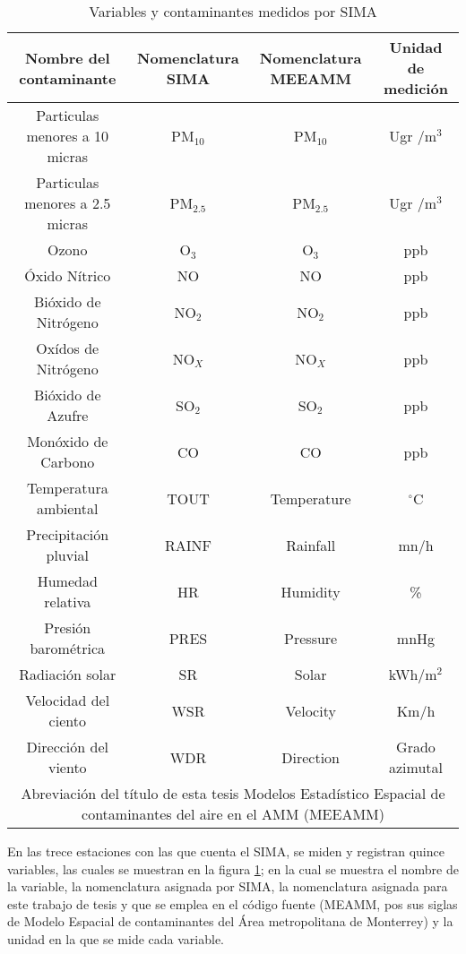 \begin{table}[H]
\centering
\caption{Variables y contaminantes medidos por SIMA}
\begin{adjustbox}{max width=0.9\textwidth}
\begin{tabular}{|c|c|c|c|}
\hline
Nombre del contaminante &Nomenclatura SIMA &Nomenclatura MEEAMM &Unidad de medición \\ \hline
Particulas menores a 10 micras &PM$_{10}$ &PM$_{10}$ &Ugr /m$^{3}$\\
Particulas menores a 2.5 micras &PM$_{2.5}$  &PM$_{2.5}$ &Ugr /m$^{3}$\\
Ozono &O$_{3}$ &O$_{3}$ &ppb\\   
Óxido Nítrico &NO &NO &ppb\\ 
Bióxido de Nitrógeno &NO$_{2}$ &NO$_{2}$ &ppb\\
Oxídos de Nitrógeno &NO$_{X}$ &NO$_{X}$ &ppb\\
Bióxido de Azufre &SO$_{2}$ &SO$_{2}$ &ppb\\
Monóxido de Carbono &CO  &CO &ppb\\
Temperatura ambiental &TOUT &Temperature &$^{\circ}$C\\
Precipitación pluvial &RAINF &Rainfall &mn/h\\
Humedad relativa &HR &Humidity &\% \\
Presión barométrica &PRES &Pressure &mnHg \\
Radiación solar &SR & Solar &kWh/m$^{2}$ \\
Velocidad del ciento &WSR &Velocity &Km/h \\
Dirección del viento &WDR &Direction &Grado azimutal\\ \hline
\multicolumn{4}{|c|}{Abreviación del título de esta tesis Modelos Estadístico Espacial de contaminantes del aire en el AMM (MEEAMM) } \\ \hline
\end{tabular}
\end{adjustbox}
\label{variables}
\end{table}

En las trece estaciones con las que cuenta el SIMA, se miden y registran quince variables, las cuales se muestran en la figura \ref{variables}; en la cual se muestra el nombre de la variable, la nomenclatura asignada por SIMA, la nomenclatura asignada para este trabajo de tesis y que se emplea en el código fuente \citep{sernagit} (MEAMM, pos sus siglas de Modelo Espacial de contaminantes del Área metropolitana de Monterrey) y la unidad en la que se mide cada variable.

